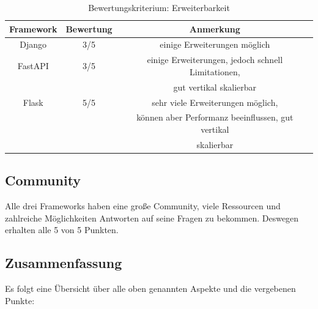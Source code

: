 \documentclass[letterpaper,11pt,leqno]{article}
\begin{document}
\begin{table}[h!]
	\begin{center}
		\begin{tabular}{|c||c|c|}
			\hline
			Framework & Bewertung & Anmerkung\\
			\hline\hline
			Django & 3/5 & einige Erweiterungen möglich\\
			FastAPI & 3/5 & einige Erweiterungen, jedoch schnell Limitationen,\\
			& & gut vertikal skalierbar\\
			Flask & 5/5 & sehr viele Erweiterungen möglich, \\
			& & können aber Performanz beeinflussen, gut vertikal\\
			& & skalierbar\\
			\hline
		\end{tabular}
		\caption{Bewertungskriterium: Erweiterbarkeit}
	\end{center}
	\label{table:9}
\end{table}

\subsection{Community}
Alle drei Frameworks haben eine große Community, viele Ressourcen und zahlreiche Möglichkeiten Antworten auf seine Fragen zu
bekommen. Deswegen erhalten alle 5 von 5 Punkten.

\subsection{Zusammenfassung}
Es folgt eine Übersicht über alle oben genannten Aspekte und die vergebenen Punkte:\clearpage
\end{document}
